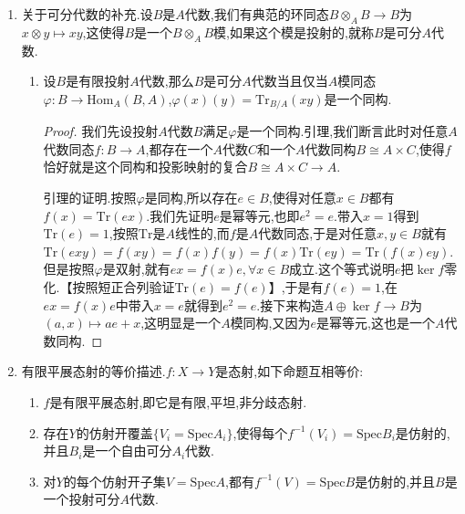 \begin{enumerate}
	\item 关于可分代数的补充.设$B$是$A$代数,我们有典范的环同态$B\otimes_AB\to B$为$x\otimes y\mapsto xy$,这使得$B$是一个$B\otimes_AB$模,如果这个模是投射的,就称$B$是可分$A$代数.
	\begin{enumerate}
		\item 设$B$是有限投射$A$代数,那么$B$是可分$A$代数当且仅当$A$模同态$\varphi:B\to\mathrm{Hom}_A(B,A)$,$\varphi(x)(y)=\mathrm{Tr}_{B/A}(xy)$是一个同构.
		\begin{proof}
			
			我们先设投射$A$代数$B$满足$\varphi$是一个同构.引理,我们断言此时对任意$A$代数同态$f:B\to A$,都存在一个$A$代数$C$和一个$A$代数同构$B\cong A\times C$,使得$f$恰好就是这个同构和投影映射的复合$B\cong A\times C\to A$.
			
			\qquad
			
			引理的证明.按照$\varphi$是同构,所以存在$e\in B$,使得对任意$x\in B$都有$f(x)=\mathrm{Tr}(ex)$.我们先证明$e$是幂等元,也即$e^2=e$.带入$x=1$得到$\mathrm{Tr}(e)=1$,按照$\mathrm{Tr}$是$A$线性的,而$f$是$A$代数同态,于是对任意$x,y\in B$就有$\mathrm{Tr}(exy)=f(xy)=f(x)f(y)=f(x)\mathrm{Tr}(ey)=\mathrm{Tr}(f(x)ey)$.但是按照$\varphi$是双射,就有$ex=f(x)e,\forall x\in B$成立.这个等式说明$e$把$\ker f$零化.【按照短正合列验证$\mathrm{Tr}(e)=f(e)$】,于是有$f(e)=1$,在$ex=f(x)e$中带入$x=e$就得到$e^2=e$.接下来构造$A\oplus\ker f\to B$为$(a,x)\mapsto ae+x$,这明显是一个$A$模同构,又因为$e$是幂等元,这也是一个$A$代数同构.
			
			\qquad
			
			
		\end{proof}
		
		
	\end{enumerate}
	
	
	
	
	\item 有限平展态射的等价描述.$f:X\to Y$是态射,如下命题互相等价:
	\begin{enumerate}
		\item $f$是有限平展态射,即它是有限,平坦,非分歧态射.
		\item 存在$Y$的仿射开覆盖$\{V_i=\mathrm{Spec}A_i\}$,使得每个$f^{-1}(V_i)=\mathrm{Spec}B_i$是仿射的,并且$B_i$是一个自由可分$A_i$代数.
		\item 对$Y$的每个仿射开子集$V=\mathrm{Spec}A$,都有$f^{-1}(V)=\mathrm{Spec}B$是仿射的,并且$B$是一个投射可分$A$代数.
	\end{enumerate}
\end{enumerate}




